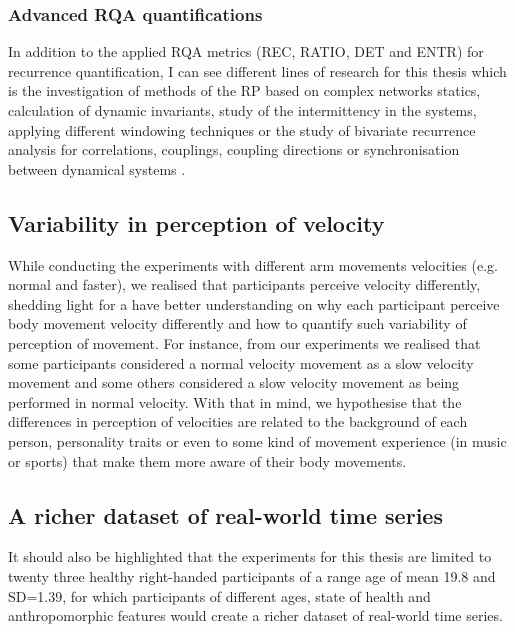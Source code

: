\subsubsection*{Advanced RQA quantifications}
In addition to the applied RQA metrics (REC, RATIO, DET and ENTR) for 
recurrence quantification, I can see different lines of research for this 
thesis which is the investigation of methods of the RP based on 
complex networks statics, calculation of dynamic invariants, 
study of the intermittency in the systems, 
applying different windowing techniques or 
the study of bivariate recurrence analysis for correlations, 
couplings, coupling directions or synchronisation between dynamical systems
\citep{marwan2007, marwan2015}.


\subsection*{Variability in perception of velocity}
While conducting the experiments with different arm movements 
velocities (e.g. normal and faster), we realised that participants 
perceive velocity differently, shedding light for a have better 
understanding on why each participant perceive body movement velocity 
differently and how to quantify such variability of perception of movement.
For instance, from our experiments we realised that some participants 
considered a normal velocity movement as a slow velocity movement and 
some others considered a slow velocity movement as being performed 
in normal velocity. 
With that in mind, we hypothesise that the differences in perception of 
velocities are related to the background of each person,
personality traits or even to some kind of movement experience 
(in music or sports) that make them more aware of their body 
movements. 

\subsection*{A richer dataset of real-world time series}
It should also be highlighted that the experiments for this thesis are 
limited to twenty three healthy right-handed participants of a 
range age of mean 19.8 and SD=1.39, for which participants of 
different ages, state of health and anthropomorphic features 
would create a richer dataset of real-world time series.


